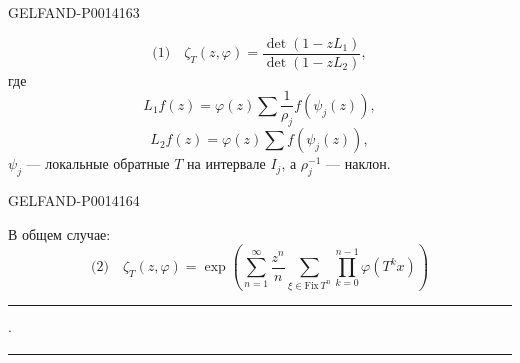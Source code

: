 \begin{GelfandAdjacentEvidence}{GELFAND-P001416}{3}


\[
\text{(1)}\quad \zeta_T(z,\varphi)=\frac{\det(1-zL_1)}{\det(1-zL_2)},
\]
где
\[
L_1f(z)=\varphi(z)\sum\frac{1}{\rho_j}f(\psi_j(z)),
\]
\[
L_2f(z)=\varphi(z)\sum f(\psi_j(z)),
\]
\(\psi_j\) — локальные обратные \(T\) на интервале \(I_j\), а \(\rho_j^{-1}\) — наклон.
\end{GelfandAdjacentEvidence}
\begin{GelfandAdjacentEvidence}{GELFAND-P001416}{4}


В общем случае:
\[
\text{(2)}\quad
\zeta_T(z,\varphi)=\exp\left(
\sum_{n=1}^{\infty}\frac{z^n}{n}
\sum_{\xi\in\mathrm{Fix}\,T^n}
\prod_{k=0}^{n-1}\varphi(T^k x)\right)
\]
\end{GelfandAdjacentEvidence}


\begin{center}
\rule{16mm}{.35pt}\enspace\(\cdot\)\enspace\rule{16mm}{.35pt}
\end{center}


